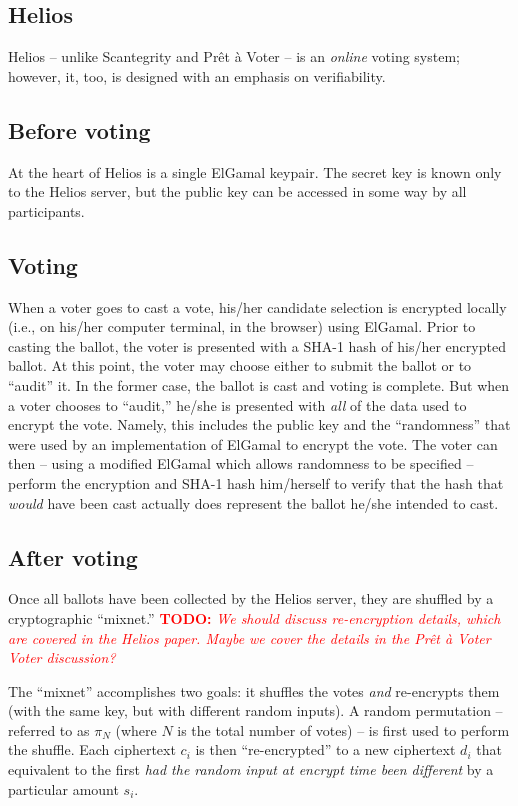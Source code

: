 \documentclass[10pt]{article}
\newcommand{\todo}[1]{\textcolor{red}{\textbf{TODO:} \emph{#1}}}
\newcommand{\preta}{Pr\^{e}t \`{a}}
\newcommand{\pv}{\preta{} Voter}
\begin{document}
\begin{multicols}{2}
\section{Helios}

Helios \cite{helios} -- unlike Scantegrity and \pv{} -- is an \emph{online} voting
system; however, it, too, is designed with an emphasis on verifiability.

\subsection{Before voting}

At the heart of Helios is a single ElGamal keypair. The secret key is known only to the Helios
server, but the public key can be accessed in some way by all participants.

\subsection{Voting}

When a voter goes to cast a vote, his/her candidate selection is encrypted locally (i.e., on his/her
computer terminal, in the browser) using ElGamal. Prior to casting the ballot, the voter is
presented with a SHA-1 hash of his/her encrypted ballot. At this point, the voter may choose either
to submit the ballot or to ``audit'' it. In the former case, the ballot is cast and voting is
complete. But when a voter chooses to ``audit,'' he/she is presented with \emph{all} of the data
used to encrypt the vote. Namely, this includes the public key and the ``randomness'' that were used
by an implementation of ElGamal to encrypt the vote. The voter can then -- using a modified ElGamal
which allows randomness to be specified -- perform the encryption and SHA-1 hash him/herself
to verify that the hash that \emph{would} have been cast actually does represent the ballot he/she
intended to cast.

\subsection{After voting}

Once all ballots have been collected by the Helios server, they are shuffled by a cryptographic
``mixnet.'' \todo{We should discuss re-encryption details, which are covered in the Helios paper.
Maybe we cover the details in the \pv{} Voter discussion?}

The ``mixnet'' accomplishes two goals: it shuffles the votes \emph{and} re-encrypts them (with the
same key, but with different random inputs). A random permutation -- referred to as $\pi_{N}$ (where
$N$ is the total number of votes) -- is first used to perform the shuffle. Each ciphertext
$c_{i}$ is then ``re-encrypted'' to a new ciphertext $d_{i}$ that equivalent to the first \emph{had
the random input at encrypt time been different} by a particular amount $s_{i}$.


\end{multicols}
\end{document}
